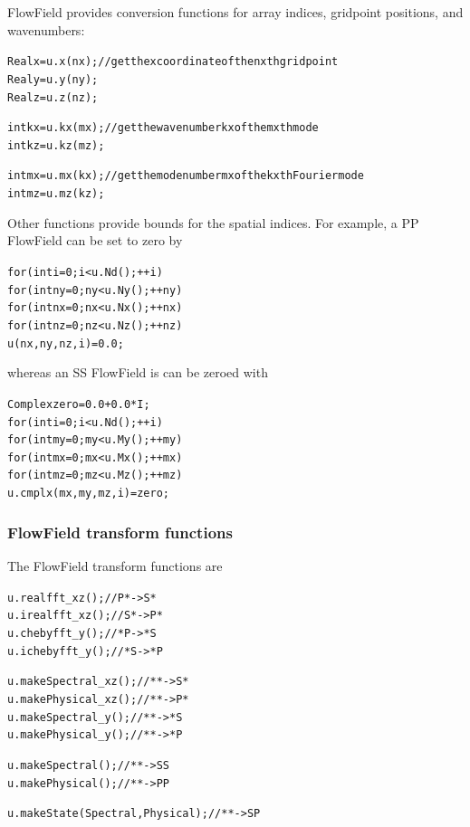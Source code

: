 \documentclass{article}[12pt]
\begin{document}
FlowField provides conversion functions for array indices, gridpoint
positions, and wavenumbers:
\begin{alltt}
  Real x = u.x(nx);   // get the x coordinate of the nxth gridpoint
  Real y = u.y(ny);
  Real z = u.z(nz);

  int kx = u.kx(mx);  // get the wavenumber kx of the mxth mode
  int kz = u.kz(mz);

  int mx = u.mx(kx);  // get the mode number mx of the kxth Fourier mode
  int mz = u.mz(kz);
\end{alltt}
Other functions provide bounds for the spatial indices. For example,
a PP FlowField can be set to zero by
\begin{alltt}
  for (int i=0; i<u.Nd(); ++i)
    for (int ny=0; ny<u.Ny(); ++ny)
      for (int nx=0; nx<u.Nx(); ++nx)
        for (int nz=0; nz<u.Nz(); ++nz)
           u(nx,ny,nz,i) = 0.0;
\end{alltt}
whereas an SS FlowField is can be zeroed with
\begin{alltt}
  Complex zero = 0.0 + 0.0*I;
  for (int i=0; i<u.Nd(); ++i)
    for (int my=0; my<u.My(); ++my)
      for (int mx=0; mx<u.Mx(); ++mx)
        for (int mz=0; mz<u.Mz(); ++mz)
           u.cmplx(mx,my,mz,i) = zero;
\end{alltt}

\subsubsection{FlowField transform functions}
\label{sec:FFtransforms}

The FlowField transform functions are
\begin{alltt}
  u.realfft_xz();         // P* -> S*
  u.irealfft_xz();        // S* -> P*
  u.chebyfft_y();         // *P -> *S
  u.ichebyfft_y();        // *S -> *P

  u.makeSpectral_xz();    // ** -> S*
  u.makePhysical_xz();    // ** -> P*
  u.makeSpectral_y();     // ** -> *S
  u.makePhysical_y();     // ** -> *P

  u.makeSpectral();       // ** -> SS
  u.makePhysical();       // ** -> PP

  u.makeState(Spectral, Physical); // ** -> SP
\end{alltt}
\end{document}
